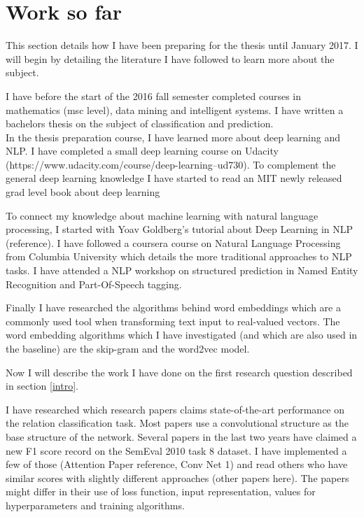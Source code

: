\documentclass[12pt]{article}
\begin{document}
\section{Work so far}

This section details how I have been preparing for the thesis until January 2017.
I will begin by detailing the literature I have followed to learn more about the subject.

I have before the start of the 2016 fall semester completed courses in mathematics (msc level), data mining and intelligent systems. I have written a bachelors thesis on the subject of classification and prediction.\\

In the thesis preparation course, I have learned more about deep learning and NLP. I have completed
a small deep learning course on Udacity (https://www.udacity.com/course/deep-learning--ud730).
To complement the general deep learning knowledge I have started to read an MIT newly released 
grad level book about deep learning\cite{dlbook}

To connect my knowledge about machine learning with natural language processing, I started with Yoav Goldberg's tutorial about Deep Learning in NLP (reference). I have followed a coursera course on Natural Language Processing from Columbia University which details the more traditional approaches to NLP tasks. I have attended a NLP workshop on structured prediction in Named Entity Recognition and Part-Of-Speech tagging. 

Finally I have researched the algorithms behind word embeddings which are a commonly used tool when transforming text input to real-valued vectors. The word embedding algorithms which I have investigated (and which are also used in the baseline) are the skip-gram and the word2vec model\cite{skipgram}.

Now I will describe the work I have done on the first research question described in section \ref{intro}.

I have researched which research papers claims state-of-the-art performance on the relation classification task. Most papers use a convolutional structure as the base structure of the network. Several papers in the last two years have claimed a new F1 score record on the SemEval 2010 task 8 dataset. I have implemented a few of those (Attention Paper reference, Conv Net 1) and read others who have similar scores with slightly different approaches (other papers here). The papers might differ in their use of loss function, input representation, values for hyperparameters and training algorithms.
\end{document}
